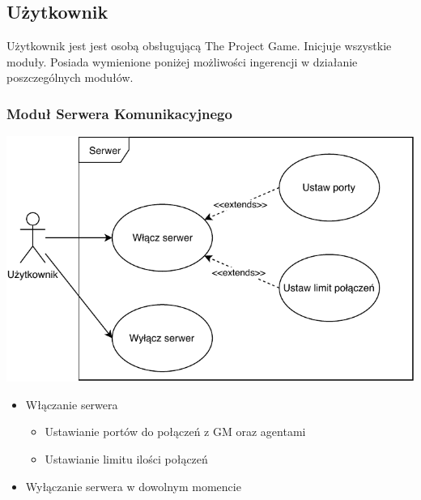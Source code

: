 \documentclass[../Dokumentacja.tex]{subfiles}
\begin{document}
\subsection{Użytkownik}
Użytkownik jest jest osobą obsługującą The Project Game.
Inicjuje wszystkie moduły. Posiada wymienione poniżej możliwości ingerencji
w działanie poszczególnych modułów.
\subsubsection{Moduł Serwera Komunikacyjnego}
\includegraphics[width=\textwidth]{resources/USER-SERVER.pdf}

\begin{itemize}
    \item Włączanie serwera
    \begin{itemize}
    	\item Ustawianie portów do połączeń z GM oraz agentami
    	\item Ustawianie limitu ilości połączeń
    \end{itemize}
    \item Wyłączanie serwera w dowolnym momencie
\end{itemize}
\end{document}
